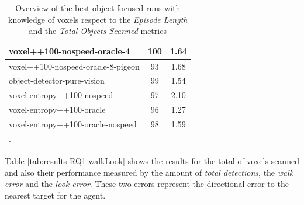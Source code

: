 \begin{longtable}{|l|c|c|}
voxel++100-nospeed-oracle-4 & 100 & {\cellcolor[HTML]{A9D2CA}} \color[HTML]{000000} 1.64 \\ \hline
voxel++100-nospeed-oracle-8-pigeon & 93 & {\cellcolor[HTML]{A1CFC5}} \color[HTML]{000000} 1.68 \\ \hline
object-detector-pure-vision & 99 & {\cellcolor[HTML]{BADBD4}} \color[HTML]{000000} 1.54 \\ \hline
voxel-entropy++100-nospeed & 97 & {\cellcolor[HTML]{55AA99}} \color[HTML]{F1F1F1} 2.10 \\ \hline
voxel-entropy++100-oracle & 96 & {\cellcolor[HTML]{EBF2F0}} \color[HTML]{000000} 1.27 \\ \hline
voxel-entropy++100-oracle-nospeed & 98 & {\cellcolor[HTML]{B1D6CE}} \color[HTML]{000000} 1.59 \\ \hline


    \caption{Overview of the best object-focused runs with knowledge of voxels respect to the \textit{Episode Length} and the \textit{Total Objects Scanned} metrics}. \label{tab:RQ1-results}
\end{longtable}

Table \ref{tab:results-RQ1-walkLook} shows the results for the total of voxels scanned and also their performance measured by the amount of \textit{total detections}, the \textit{walk error} and the \textit{look error}. These two errors represent the directional error to the nearest target for the agent. 

